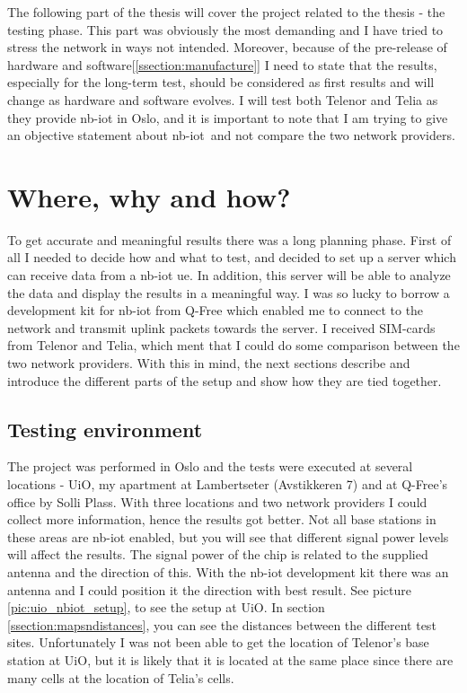 \documentclass[USenglish]{ifimaster}  %
\begin{document}
The following part of the thesis will cover the project related to the thesis - the testing phase. This part was obviously the most demanding and I have tried to stress the network in ways not intended. Moreover, because of the pre-release of hardware and software[\ref{ssection:manufacture}] I need to state that the results, especially for the long-term test, should be considered as first results and will change as hardware and software evolves. I will test both Telenor and Telia as they provide \acrshort{nb-iot} in Oslo, and it is important to note that I am trying to give an objective statement about \acrshort{nb-iot} and not compare the two network providers.

\chapter{Where, why and how?} \label{chapter:wherewhynhow}
To get accurate and meaningful results there was a long planning phase. First of all I needed to decide how and what to test, and decided to set up a server which can receive data from a \acrshort{nb-iot} \acrshort{ue}. In addition, this server will be able to analyze the data and display the results in a meaningful way. I was so lucky to borrow a development kit for \acrshort{nb-iot} from Q-Free which enabled me to connect to the network and transmit uplink packets towards the server. I received SIM-cards from Telenor and Telia, which ment that I could do some comparison between the two network providers. With this in mind, the next sections describe and introduce the different parts of the setup and show how they are tied together.

\section{Testing environment}
The project was performed in Oslo and the tests were executed at several locations - UiO, my apartment at Lambertseter (Avstikkeren 7) and at Q-Free's office by Solli Plass. With three locations and two network providers I could collect more information, hence the results got better.
Not all base stations in these areas are \acrshort{nb-iot} enabled, but you will see that different signal power levels will affect the results. The signal power of the chip is related to the supplied antenna and the direction of this. With the \acrshort{nb-iot} development kit there was an antenna and I could position it the direction with best result. See picture \vref{pic:uio_nbiot_setup}, to see the setup at UiO. In section \vref{ssection:mapsndistances}, you can see the distances between the different test sites. Unfortunately I was not been able to get the location of Telenor's base station at UiO, but it is likely that it is located at the same place since there are many cells at the location of Telia's cells.
\end{document}
